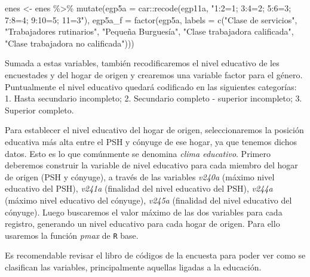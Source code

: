 \documentclass[
]{book}
\newenvironment{Shaded}{\begin{snugshade}}{\end{snugshade}}
\newcommand{\AttributeTok}[1]{\textcolor[rgb]{0.77,0.63,0.00}{#1}}
\newcommand{\FunctionTok}[1]{\textcolor[rgb]{0.00,0.00,0.00}{#1}}
\newcommand{\NormalTok}[1]{#1}
\newcommand{\OtherTok}[1]{\textcolor[rgb]{0.56,0.35,0.01}{#1}}
\newcommand{\SpecialCharTok}[1]{\textcolor[rgb]{0.00,0.00,0.00}{#1}}
\newcommand{\StringTok}[1]{\textcolor[rgb]{0.31,0.60,0.02}{#1}}
\begin{document}
\begin{Shaded}
\begin{Highlighting}[]
\NormalTok{enes }\OtherTok{\textless{}{-}}\NormalTok{ enes }\SpecialCharTok{\%\textgreater{}\%} 
    \FunctionTok{mutate}\NormalTok{(}\AttributeTok{egp5a =}\NormalTok{ car}\SpecialCharTok{::}\FunctionTok{recode}\NormalTok{(egp11a, }\StringTok{"1:2=1; 3:4=2; 5:6=3; 7:8=4; 9:10=5; 11=3"}\NormalTok{),}
                 \AttributeTok{egp5a\_f =} \FunctionTok{factor}\NormalTok{(egp5a, }\AttributeTok{labels =} \FunctionTok{c}\NormalTok{(}\StringTok{"Clase de servicios"}\NormalTok{, }\StringTok{"Trabajadores rutinarios"}\NormalTok{, }
                                                                                 \StringTok{"Pequeña Burguesía"}\NormalTok{, }\StringTok{"Clase trabajadora calificada"}\NormalTok{,}
                                                                                 \StringTok{"Clase trabajadora no calificada"}\NormalTok{)))}
\end{Highlighting}
\end{Shaded}

Sumada a estas variables, también recodificaremos el nivel educativo de les encuestades y del hogar de origen y crearemos una variable factor para el género. Puntualmente el nivel educativo quedará codificado en las siguientes categorías: 1. Hasta secundario incompleto; 2. Secundario completo - superior incompleto; 3. Superior completo.

Para establecer el nivel educativo del hogar de origen, seleccionaremos la posición educativa más alta entre el PSH y cónyuge de ese hogar, ya que tenemos dichos datos. Esto es lo que comúnmente se denomina \emph{clima educativo}. Primero deberemos construir la variable de nivel educativo para cada miembro del hogar de origen (PSH y cónyuge), a través de las variables \emph{v240a} (máximo nivel educativo del PSH), \emph{v241a} (finalidad del nivel educativo del PSH), \emph{v244a} (máximo nivel educativo del cónyuge), \emph{v245a} (finalidad del nivel educativo del cónyuge). Luego buscaremos el valor máximo de las dos variables para cada registro, generando un nivel educativo para cada hogar de origen. Para ello usaremos la función \emph{pmax} de \texttt{R} base.

Es recomendable revisar el libro de códigos de la encuesta para poder ver como se clasifican las variables, principalmente aquellas ligadas a la educación.
\end{document}
